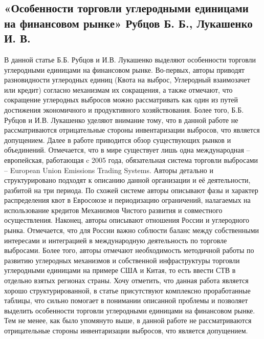 \documentclass[a4paper,14pt]{article}
\begin{document}
\subsection{«Особенности торговли углеродными единицами на финансовом рынке» Рубцов Б. Б., Лукашенко И. В. }
В данной статье Б.Б. Рубцов и И.В. Лукашенко выделяют особенности торговли углеродными единицами на финансовом рынке. Во-первых, авторы приводят разновидности углеродных единиц (Квота на выброс, Углеродный взаимозачет или кредит) согласно механизмам их сокращения, а также отмечают, что сокращение углеродных выбросов можно рассматривать как один из путей достижения экономичного и продуктивного хозяйствования. Более того, Б.Б. Рубцов и И.В. Лукашенко уделяют внимание тому, что в данной работе не рассматриваются отрицательные стороны инвентаризации выбросов, что является допущением. Далее в работе приводится обзор существующих рынков и объединений. Отмечается, что в мире существует лишь одна международная – европейская, работающая c 2005 года, обязательная система торговли выбросами – European Union Emissions Trading Systems. Авторы детально и структурировано подходят к описанию данной организации и её деятельности, разбитой на три периода. По схожей системе авторы описывают фазы и характер распределения квот в Евросоюзе и периодизацию ограничений, налагаемых на использование кредитов Механизмов Чистого развития и совместного осуществления. Наконец, авторы описывают отношения России и углеродного рынка. Отмечается, что для России важно соблюсти баланс между собственными интересами и интеграцией в международную деятельность по торговле выбросами. Более того, авторы отмечают необходимость методичной работы по развитию углеродных механизмов и собственной инфраструктуры торговли углеродными единицами на примере США и Китая, то есть ввести СТВ в отдельно взятых регионах страны. Хочу отметить, что данная работа является хорошо структурированной, в статье присутствуют комплексно проработанные таблицы, что сильно помогает в понимании описанной проблемы и позволяет выделить особенности торговли углеродными единицами на финансовом рынке. Тем не менее, как было упомянуто выше, в данной работе не рассматриваются отрицательные стороны инвентаризации выбросов, что является допущением.
\end{document}
